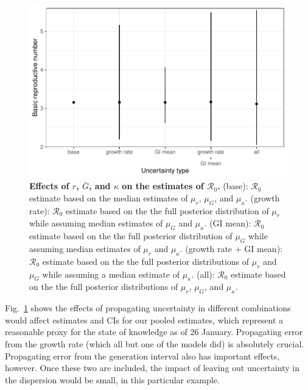 \documentclass[12pt]{article}
\newcommand{\fref}[1]{Fig.~\ref{fig:#1}}
\begin{document}
\begin{figure}[!ht]
\includegraphics[width=\textwidth]{figure2.pdf}
\caption{
\textbf{Effects of $r$, $\bar G$, and $\kappa$ on the estimates of $\mathcal R_0$.}
(base): $\mathcal R_0$ estimate based on the median estimates of $\mu_r$, $\mu_G$, and $\mu_\kappa$.
(growth rate): $\mathcal R_0$ estimate based on the the full posterior distribution of $\mu_r$ while assuming median estimates of $\mu_G$ and $\mu_\kappa$.
(GI mean): $\mathcal R_0$ estimate based on the the full posterior distribution of $\mu_G$ while assuming median estimates of $\mu_r$ and $\mu_\kappa$.
(growth rate + GI mean): $\mathcal R_0$ estimate based on the the full posterior distributions of $\mu_r$ and $\mu_G$ while assuming a median estimate of $\mu_\kappa$.
(all): $\mathcal R_0$ estimate based on the the full posterior distributions of  $\mu_r$, $\mu_G$, and $\mu_\kappa$.
}
\label{fig:eff}
\end{figure}

\fref{eff} shows the effects of propagating uncertainty in different combinations would affect estimates and CIs for our pooled estimates, which represent a reasonable proxy for the state of knowledge as of 26 January. 
Propagating error from the growth rate (which all but one of the models did) is absolutely crucial. 
Propagating error from the generation interval also has important effects, however.
Once these two are included, the impact of leaving out uncertainty in the dispersion would be small, in this particular example.
\end{document}
